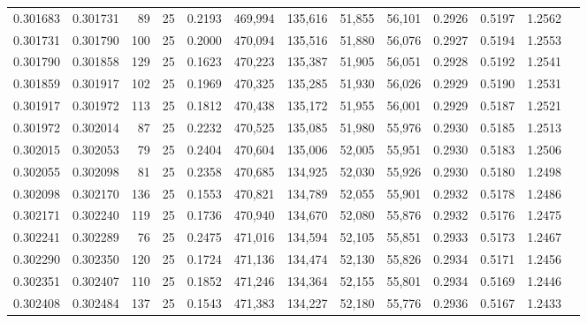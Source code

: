 \begin{tabular}{rrrrrrrrrrrrr}
0.301683 & 0.301731 &    89 &  25 &                                     0.2193 & 469,994 & 135,616 &  51,855 &  56,101 & 0.2926 & 0.5197 & 1.2562 \\
0.301731 & 0.301790 &   100 &  25 &                                     0.2000 & 470,094 & 135,516 &  51,880 &  56,076 & 0.2927 & 0.5194 & 1.2553 \\
0.301790 & 0.301858 &   129 &  25 &                                     0.1623 & 470,223 & 135,387 &  51,905 &  56,051 & 0.2928 & 0.5192 & 1.2541 \\
0.301859 & 0.301917 &   102 &  25 &                                     0.1969 & 470,325 & 135,285 &  51,930 &  56,026 & 0.2929 & 0.5190 & 1.2531 \\
0.301917 & 0.301972 &   113 &  25 &                                     0.1812 & 470,438 & 135,172 &  51,955 &  56,001 & 0.2929 & 0.5187 & 1.2521 \\
0.301972 & 0.302014 &    87 &  25 &                                     0.2232 & 470,525 & 135,085 &  51,980 &  55,976 & 0.2930 & 0.5185 & 1.2513 \\
0.302015 & 0.302053 &    79 &  25 &                                     0.2404 & 470,604 & 135,006 &  52,005 &  55,951 & 0.2930 & 0.5183 & 1.2506 \\
0.302055 & 0.302098 &    81 &  25 &                                     0.2358 & 470,685 & 134,925 &  52,030 &  55,926 & 0.2930 & 0.5180 & 1.2498 \\
0.302098 & 0.302170 &   136 &  25 &                                     0.1553 & 470,821 & 134,789 &  52,055 &  55,901 & 0.2932 & 0.5178 & 1.2486 \\
0.302171 & 0.302240 &   119 &  25 &                                     0.1736 & 470,940 & 134,670 &  52,080 &  55,876 & 0.2932 & 0.5176 & 1.2475 \\
0.302241 & 0.302289 &    76 &  25 &                                     0.2475 & 471,016 & 134,594 &  52,105 &  55,851 & 0.2933 & 0.5173 & 1.2467 \\
0.302290 & 0.302350 &   120 &  25 &                                     0.1724 & 471,136 & 134,474 &  52,130 &  55,826 & 0.2934 & 0.5171 & 1.2456 \\
0.302351 & 0.302407 &   110 &  25 &                                     0.1852 & 471,246 & 134,364 &  52,155 &  55,801 & 0.2934 & 0.5169 & 1.2446 \\
0.302408 & 0.302484 &   137 &  25 &                                     0.1543 & 471,383 & 134,227 &  52,180 &  55,776 & 0.2936 & 0.5167 & 1.2433 \\

\end{tabular}
